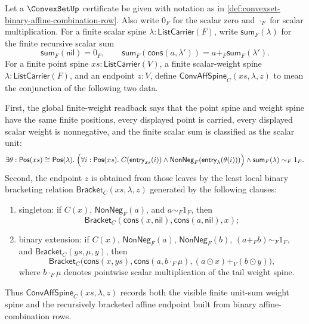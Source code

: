 \begin{definition}
\label{def:convexset-finite-affine-spine-data}
Let a $\ConvexSetUp$ certificate be given with notation as in
\autoref{def:convexset-binary-affine-combination-row}. Also write $0_F$ for
the scalar zero and $\cdot_F$ for scalar multiplication. For a finite scalar
spine $\lambda:\mathsf{ListCarrier}(F)$, write $\mathsf{sum}_F(\lambda)$ for
the finite recursive scalar sum
$$
\mathsf{sum}_F(\mathsf{nil})=0_F,
\qquad
\mathsf{sum}_F(\mathsf{cons}(a,\lambda'))=a+_F\mathsf{sum}_F(\lambda').
$$
For a finite point spine $xs:\mathsf{ListCarrier}(V)$, a finite scalar-weight
spine $\lambda:\mathsf{ListCarrier}(F)$, and an endpoint $z:V$, define
$\mathsf{ConvAffSpine}_C(xs,\lambda,z)$ to mean the conjunction of the
following two data.

First, the global finite-weight readback says that the point spine and weight
spine have the same finite positions, every displayed point is carried, every
displayed scalar weight is nonnegative, and the finite scalar sum is classified
as the scalar unit:
$$
\exists \theta:\mathsf{Pos}(xs)\cong\mathsf{Pos}(\lambda).\;
\Bigl(\forall i:\mathsf{Pos}(xs).\;
C(\mathsf{entry}_{xs}(i))\land
\mathsf{NonNeg}_F(\mathsf{entry}_{\lambda}(\theta(i)))\Bigr)
\land \mathsf{sum}_F(\lambda)\sim_F1_F.
$$
Second, the endpoint $z$ is obtained from those leaves by the least local
binary bracketing relation $\mathsf{Bracket}_C(xs,\lambda,z)$ generated by the
following clauses:
\begin{enumerate}
  \item singleton: if $C(x)$, $\mathsf{NonNeg}_F(a)$, and $a\sim_F1_F$, then
  $$
  \mathsf{Bracket}_C(\mathsf{cons}(x,\mathsf{nil}),
  \mathsf{cons}(a,\mathsf{nil}),x);
  $$
  \item binary extension: if $C(x)$, $\mathsf{NonNeg}_F(a)$,
  $\mathsf{NonNeg}_F(b)$, $(a+_F b)\sim_F1_F$, and
  $\mathsf{Bracket}_C(ys,\mu,y)$, then
  $$
  \mathsf{Bracket}_C\bigl(\mathsf{cons}(x,ys),
  \mathsf{cons}(a,b\cdot_F\mu),
  (a\odot x)+_V(b\odot y)\bigr),
  $$
  where $b\cdot_F\mu$ denotes pointwise scalar multiplication of the tail
  weight spine.
\end{enumerate}
Thus $\mathsf{ConvAffSpine}_C(xs,\lambda,z)$ records both the visible finite
unit-sum weight spine and the recursively bracketed affine endpoint built from
binary affine-combination rows.
\end{definition}

